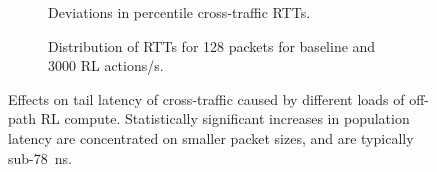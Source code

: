 \documentclass[sigconf,natbib=false]{acmart}
\begin{document}
\begin{figure}
	\centering
	\begin{subfigure}{0.45\linewidth}
		\caption{Deviations in  percentile cross-traffic RTTs.\label{fig:dataplane-heat}}
	\end{subfigure}
	\hspace{0.05\linewidth}
		\begin{subfigure}{0.45\linewidth}
		\caption{Distribution of RTTs for \SI{128}{\byte} packets for baseline and \num{3000} RL actions/s.\label{fig:dataplane-example}}
	\end{subfigure}
	\caption{Effects on tail latency of cross-traffic caused by different loads of off-path RL compute. Statistically significant increases in population latency are concentrated on smaller packet sizes, and are typically sub-\SI{78}{\nano\second}.\label{fig:dataplane-coop}}
\end{figure}
\end{document}
